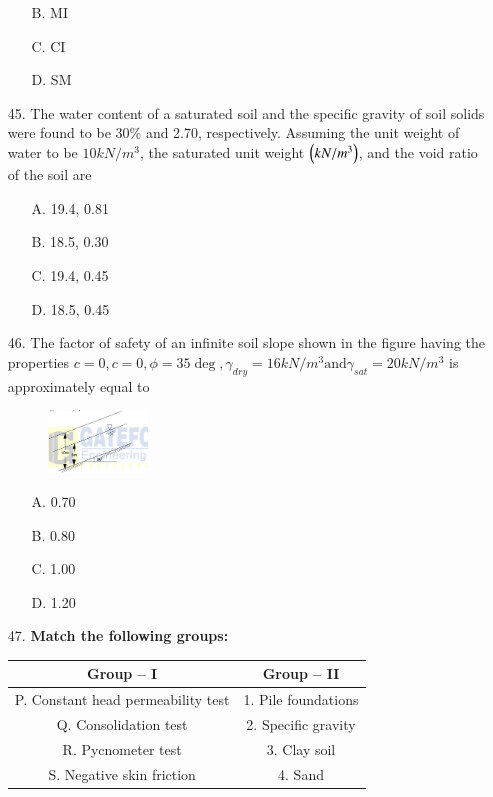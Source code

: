 \documentclass[journal]{IEEEtran}
\begin{document}
\begin{enumerate}
\begin{enumerate}
    \item [B.] MI
    \item [C.] CI
    \item [D.] SM
  \end{enumerate}
  \item[45.] The water content of a saturated soil and the specific gravity of soil solids were
  found to be 30\% and 2.70, respectively. Assuming the unit weight of water to be
  $10kN / m^3$, the saturated unit weight $\left(kN/m^3\right)$, and the void ratio of the soil are 
  \begin{enumerate}
    \item [A.] 19.4, 0.81
    \item [B.] 18.5, 0.30
    \item [C.] 19.4, 0.45
    \item [D.] 18.5, 0.45
  \end{enumerate}
  \item [46.] The factor of safety of an infinite soil slope shown in the figure having the
  properties $c=0, c=0,\phi=35\deg,\gamma_{dry}=16kN/m^3 \text{and} \gamma_{sat}=20kN/m^3$ is
  approximately equal to
  \begin{figure}[h!]
    \centering
    \includegraphics[width=0.25\textwidth]{figs/Fig_6.png}  %
    \label{fig:sample6}
\end{figure}
  \begin{enumerate}
    \item [A.] 0.70
    \item [B.] 0.80
    \item [C.] 1.00
    \item [D.] 1.20
  \end{enumerate} 
  \item [47.] \textbf{Match the following groups:}

  \begin{center}
  \begin{tabular}{|c c|}
  \hline
  \textbf{Group – I} & \textbf{Group – II} \\
  \hline
  P. Constant head permeability test & 1. Pile foundations \\
  Q. Consolidation test               & 2. Specific gravity \\
  R. Pycnometer test                  & 3. Clay soil \\
  S. Negative skin friction            & 4. Sand \\
  \hline
  \end{tabular}
  \end{center}
  

\end{enumerate}
\end{document}

